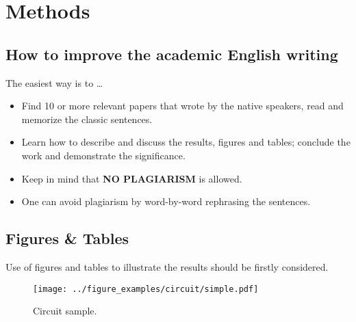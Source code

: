 

%

\section{Methods}
\label{sec:methods}

\subsection{How to improve the academic English writing}

The easiest way is to \ldots

\begin{itemize}
  \item Find 10 or more relevant papers that wrote by the native speakers, read and memorize the classic sentences.
  \item Learn how to describe and discuss the results, figures and tables; conclude the work and demonstrate the significance.
  \item Keep in mind that \textbf{NO PLAGIARISM} is allowed.
  \item One can avoid plagiarism by word-by-word rephrasing the sentences.
\end{itemize}


\subsection{Figures \& Tables}

Use of figures and tables to illustrate the results should be firstly considered.

\begin{figure}[h]
  \centering
  \texttt{[image: ../figure\_examples/circuit/simple.pdf]}
  \caption{Circuit sample.}
  \label{fig:circuit_simple}
\end{figure}



